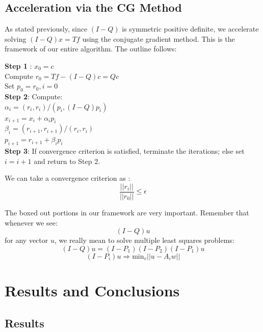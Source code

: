 \documentclass[a4paper,12pt]{article}
\begin{document}
 \subsection{Acceleration via the CG Method}
As stated previously, since $(I-Q)$ is symmetric positive definite, we accelerate solving $(I-Q)x = Tf$  using the conjugate gradient method. This is the framework of our entire algorithm. The outline follows:

\vspace{.2in}
 \noindent \textbf{Step 1} : $x_0 = c$ \\
\hspace{.5in} Compute $r_0 = Tf - \boxed{(I-Q)c} = Qc$\\
\hspace{.5in} Set $p_0 = r_0, i = 0$ \\
\textbf{Step 2}:  Compute: \\
\hspace{.5in} $\alpha_i = (r_i, r_i)/(p_i,\boxed{(I-Q)p_i})$ \\
\hspace{.5in} $ x_{i+1} = x_i + \alpha_i p_i $ \\
\hspace{.5in} $\beta_i = (r_{i+1}, r_{i+1})/(r_i, r_i) $ \\
\hspace{.5in} $p_{i+1} = r_{i+1} + \beta_i p _i $ \\
\textbf{Step 3}: If convergence criterion is satisfied, terminate the iterations; else set $i = i+1$ and return to Step 2.

 We can take a convergence criterion as : $$ \frac{ ||r_i||}{||r_0||} \leq \epsilon$$


The boxed out portions in our framework are very important. Remember that whenever we see: $$(I - Q) u$$ for any vector $u$, we really mean to solve multiple least squares problems:
$$(I-Q) u = (I-P_1)(I-P_2)(I-P_1) u $$
$$(I-P_i) u \Rightarrow \text{min}_{v} ||u-A_i w|| $$


\section{Results and Conclusions}

\subsection{Results}
\end{document}

